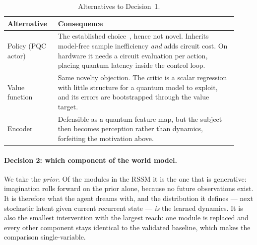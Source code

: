 \documentclass[11pt,onecolumn]{article}
\begin{document}
\begin{table}[htb]\centering\small
\caption{Alternatives to Decision~1.}\label{tab:alt1}
\begin{tabular}{p{0.20\linewidth}p{0.72\linewidth}}
\toprule
Alternative & Consequence \\
\midrule
Policy (PQC actor) &
The established choice~\cite{chen2020,skolik2023}, hence not novel.
Inherits model-free sample inefficiency \emph{and} adds circuit cost.
On hardware it needs a circuit evaluation per action, placing quantum
latency inside the control loop. \\[2pt]
Value function &
Same novelty objection. The critic is a scalar regression with little
structure for a quantum model to exploit, and its errors are
bootstrapped through the value target. \\[2pt]
Encoder &
Defensible as a quantum feature map, but the subject then becomes
perception rather than dynamics, forfeiting the motivation above. \\
\bottomrule
\end{tabular}
\end{table}

\paragraph{Decision 2: which component of the world model.}
We take the \emph{prior}. Of the modules in the RSSM it is the one that
is generative: imagination rolls forward on the prior alone, because no
future observations exist. It is therefore what the agent dreams with,
and the distribution it defines --- next stochastic latent given current
recurrent state --- \emph{is} the learned dynamics. It is also the
smallest intervention with the largest reach: one module is replaced and
every other component stays identical to the validated baseline, which
makes the comparison single-variable.
\end{document}
